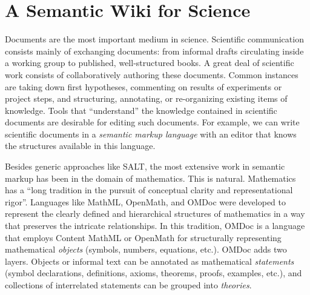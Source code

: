 \section{A Semantic Wiki for Science}
\label{sec:science}

\begin{figure}
  \centering
  \vspace{-.9cm}
  \vspace{-1.2cm}
\end{figure}
Documents are the most important medium in science.
Scientific
communication consists mainly of exchanging documents: from informal drafts circulating
inside a working group to published, well-structured books.  A great deal of scientific
work consists of collaboratively authoring these documents. 
Common instances are taking down first hypotheses,
commenting on results of experiments or project steps, and structuring, annotating,
or re-organizing existing items of knowledge.  Tools that
``understand'' the knowledge contained in scientific documents are desirable for
editing such documents.  For example, we can  write scientific documents in a
\textit{semantic markup language} with an editor that knows the structures available in this
language. 

Besides generic approaches like SALT\cite{Groza:SALT07}, the most extensive work
in semantic markup has been in the domain of mathematics.  This is natural.
Mathematics has a ``long tradition in the pursuit of conceptual clarity and
representational rigor''\cite{Kohlhase:omdoc1.2}.  Languages like
MathML\cite{CarlisleEd:MathML07}, OpenMath\cite{BusCapCar:2oms04}, and
OMDoc\cite{Kohlhase:omdoc1.2} were developed to represent the clearly defined
and hierarchical structures of mathematics in a way that preserves the intricate
relationships.  In this tradition, OMDoc is a language that employs Content
MathML or OpenMath for structurally representing mathematical \emph{objects}
(symbols, numbers, equations, etc.).  OMDoc adds two layers.  Objects or
informal text can be annotated as mathematical \emph{statements} (symbol
declarations, definitions, axioms, theorems, proofs, examples, etc.), and
collections of interrelated statements can be grouped into \emph{theories}.

